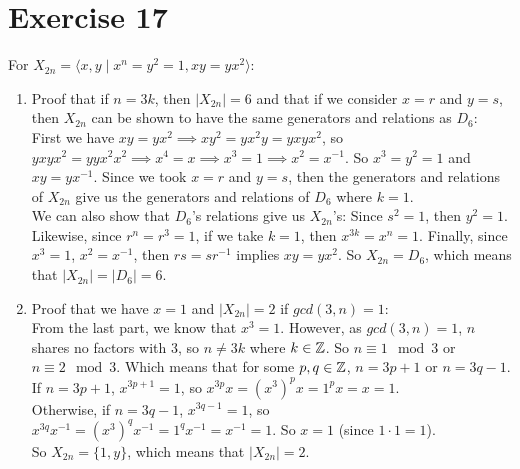 \documentclass[12pt]{article}
\begin{document}
    \section*{Exercise 17}
    For $X_{2n} = \langle x, y \mid x^n = y^2 = 1, xy = yx^2 \rangle$: \\
    \begin{enumerate}[label=\textbf{\alph*.}]
        \item 
            Proof that if $n = 3k$, then $|X_{2n}| = 6$
            and that if we consider $x = r$ and $y = s$,
            then $X_{2n}$ can be shown to have the same generators and 
            relations as $D_6$: \\
            First we have $xy = yx^2
            \implies xy^2 = yx^2y = yxyx^2$,
            so $yxyx^2 = yyx^2x^2 \implies
            x^4 = x
            \implies x^3 = 1
            \implies x^2 = x^{-1}$.
            So $x^3 = y^2 = 1$ and $xy = yx^{-1}$.
            Since we took $x = r$ and $y = s$,
            then the generators and relations of $X_{2n}$ give us the
            generators and relations of $D_6$ where $k = 1$. \\
            We can also show that $D_6$'s relations give us $X_{2n}$'s:
            Since $s^2 = 1$, then $y^2 = 1$.
            Likewise, since $r^n = r^3 = 1$,
            if we take $k = 1$,
            then $x^{3k} = x^n = 1$.
            Finally, since $x^3 = 1$, $x^2 = x^{-1}$,
            then $rs = sr^{-1}$ implies $xy = yx^{2}$.
            So $X_{2n} = D_6$,
            which means that $|X_{2n}| = |D_6| = 6$.
        \item 
            Proof that we have $x = 1$ and $|X_{2n}| = 2$
            if $gcd(3, n) = 1$: \\
            From the last part, we know that $x^3 = 1$.
            However, as $gcd(3, n) = 1$, $n$ shares no factors with 3,
            so $n \neq 3k$ where $k \in \mathbb{Z}$.
            So $n \equiv 1 \mod 3$ or $n \equiv 2 \mod 3$. 
            Which means that for some $p, q \in \mathbb{Z}$,
            $n = 3p + 1$ or $n = 3q - 1$. \\
            If $n = 3p + 1$, $x^{3p + 1} = 1$,
            so $x^{3p}x = (x^3)^px = 1^px = x = 1$. \\
            Otherwise, if $n = 3q - 1$, $x^{3q - 1} = 1$,
            so $x^{3q}x^{-1} = (x^3)^qx^{-1} = 1^qx^{-1} = x^{-1} = 1$.
            So $x = 1$ (since $1 \cdot 1 = 1$). \\
            So $X_{2n} = \{1, y\}$,
            which means that $|X_{2n}| = 2$.
    \end{enumerate}   
\end{document}
